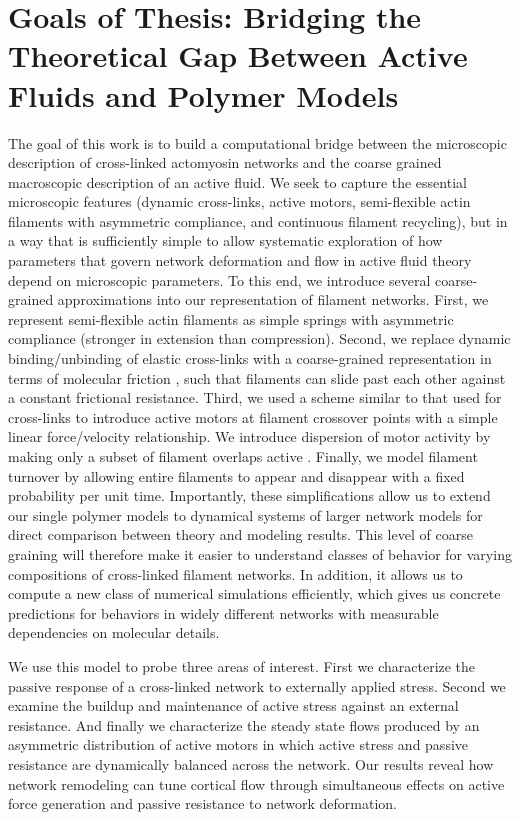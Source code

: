 \section{Goals of Thesis: Bridging the Theoretical Gap Between Active Fluids and Polymer Models}
The goal of this work is to build a computational bridge between the microscopic description of cross-linked actomyosin networks and the coarse grained macroscopic description of an active fluid.  We seek to capture the essential microscopic features (dynamic cross-links, active motors, semi-flexible actin filaments with asymmetric compliance, and continuous filament recycling), but in a way that is sufficiently simple to allow systematic exploration of how parameters that govern network deformation and flow in active fluid theory depend on microscopic parameters. To this end, we introduce several coarse-grained approximations into our representation of filament networks. First, we represent semi-flexible actin filaments as simple springs with asymmetric compliance (stronger in extension than compression). Second, we replace  dynamic binding/unbinding of elastic cross-links with a coarse-grained representation in terms of molecular friction \cite{theo_friction,theo_frictionSam,theo_molefric}, such that filaments can slide past each other against a constant frictional resistance. Third, we used a scheme similar to that used for cross-links to introduce active motors at filament crossover points with a simple linear force/velocity relationship.  We introduce dispersion of motor activity by making only a subset of filament overlaps active \cite{theo_frictionShila}.  Finally, we model filament turnover by allowing entire filaments to appear and disappear with a fixed probability per unit time. Importantly, these simplifications allow us to extend our single polymer models to dynamical systems of larger network models for direct comparison between theory and modeling results. This level of coarse graining will therefore make it easier to understand classes of behavior for varying compositions of cross-linked filament networks. In addition, it allows us to compute a new class of numerical simulations efficiently, which gives us concrete predictions for behaviors in widely different networks with measurable dependencies on molecular details.

We use this model to probe three areas of interest. First we characterize the passive response of a cross-linked network to externally applied stress. Second we examine the buildup and maintenance of active stress against an external resistance. And finally we characterize the steady state flows produced by an asymmetric distribution of active motors in which active stress and passive resistance are dynamically balanced across the network.  Our results reveal how network remodeling can tune cortical flow through simultaneous effects on active force generation and passive resistance to network deformation.